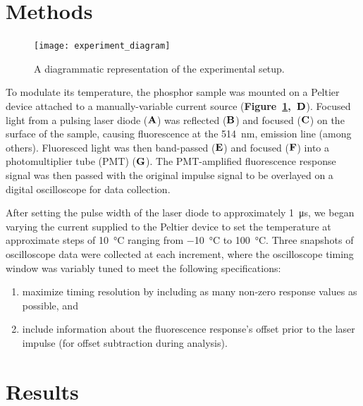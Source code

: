 \documentclass[12pt]{report}
\begin{document}
  \section*{Methods}{

  \begin{figure}[h]
    \centering
    \texttt{[image: experiment\_diagram]}
    \caption{A diagrammatic representation of the experimental setup.}\label{fig:setup}
  \end{figure}

    To modulate its temperature, the phosphor sample was mounted on a Peltier device attached to a manually-variable current source (\textbf{Figure~\ref*{fig:setup},~\(\bf{D}\)}). Focused light from a pulsing laser diode (\(\bf{A}\)) was reflected (\(\bf{B}\)) and focused (\(\bf{C}\)) on the surface of the sample, causing fluorescence at the \SI{514}{\nm},  emission line (among others). Fluoresced light was then band-passed (\(\bf{E}\)) and focused (\(\bf{F}\)) into a photomultiplier tube (PMT) (\(\bf{G}\)). The PMT-amplified fluorescence response signal was then passed with the original impulse signal to be overlayed on a digital oscilloscope for data collection.
    
    After setting the pulse width of the laser diode to approximately \SI{1}{\micro\second}, we began varying the current supplied to the Peltier device to set the temperature at approximate steps of \SI{10}{\degreeCelsius} ranging from \SI{-10}{\degreeCelsius} to \SI{100}{\degreeCelsius}. Three snapshots of oscilloscope data were collected at each increment, where the oscilloscope timing window was variably tuned to meet the following specifications:
      
      \begin{enumerate}
        \item maximize timing resolution by including as many non-zero response values as possible, and
        \item include information about the fluorescence response's offset prior to the laser impulse (for offset subtraction during analysis).
      \end{enumerate}
  }

  \section*{Results}
\end{document}
